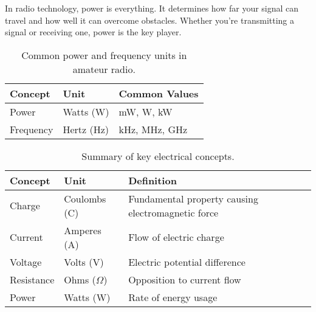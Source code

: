 In radio technology, power is everything. It determines how far your signal can travel and how well it can overcome obstacles. Whether you're transmitting a signal or receiving one, power is the key player.

\begin{table}[h]
    \label{tab:power-freq-units}
    \begin{tabular}{|l|l|l|}
        \hline
        \textbf{Concept} & \textbf{Unit} & \textbf{Common Values} \\
        \hline
        Power & Watts (W) & mW, W, kW \\
        Frequency & Hertz (Hz) & kHz, MHz, GHz \\
        \hline
    \end{tabular}
    \centering
    \caption{Common power and frequency units in amateur radio.}

\end{table}

\begin{table}[h]
    \centering
    \begin{tabular}{|l|l|l|}
        \hline
        \textbf{Concept} & \textbf{Unit} & \textbf{Definition} \\
        \hline
        Charge & Coulombs (C) & Fundamental property causing electromagnetic force \\
        Current & Amperes (A) & Flow of electric charge \\
        Voltage & Volts (V) & Electric potential difference \\
        Resistance & Ohms (\(\Omega\)) & Opposition to current flow \\
        Power & Watts (W) & Rate of energy usage \\
        \hline
    \end{tabular}
    \caption{Summary of key electrical concepts.}
    \label{tab:electrical-concepts}

\end{table}



